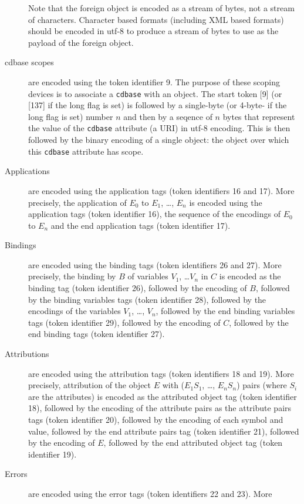 \documentclass{report}
\def\acronym#1{\textsf{#1}}
\begin{document}
\begin{description}
    Note that the foreign object is encoded as a stream of bytes, not a stream of
    characters. Character based formats (including XML based formats) should be encoded in
    \acronym{utf-8} to produce a stream of bytes to use as the payload of the foreign
    object.
  \item[cdbase scopes] are encoded using the token identifier 9. The purpose of these
    scoping devices is to associate a \lstinline|cdbase| with an object. The start token
    [9] (or [137] if the long flag is set) is followed by a single-byte (or 4-byte- if the
    long flag is set) number $n$ and then by a seqence of $n$ bytes that represent the
    value of the \lstinline|cdbase| attribute (a URI) in \acronym{utf-8} encoding. This
    is then followed by the binary encoding of a single object: the object over which this
    \lstinline|cdbase| attribute has scope.
  \item[Applications] are encoded using the application tags (token identifiers 16 and
    17). More precisely, the application of $E_0$ to $E_1$, \ldots, $E_n$ is encoded using
    the application tags (token identifier 16), the sequence of the encodings of $E_0$ to
    $E_n$ and the end application tags (token identifier 17).
  \item[Bindings] are encoded using the binding tags (token identifiers 26 and 27). More
    precisely, the binding by $B$ of variables $V_1$, \ldots $V_n$ in $C$ is encoded as
    the binding tag (token identifier 26), followed by the encoding of $B$, followed by
    the binding variables tags (token identifier 28), followed by the encodings of the
    variables $V_1$, \ldots, $V_n$, followed by the end binding variables tags (token
    identifier 29), followed by the encoding of $C$, followed by the end binding tags
    (token identifier 27).
  \item[Attributions] are encoded using the attribution tags (token identifiers 18 and
    19). More precisely, attribution of the object $E$ with ($E_1 S_1$, \ldots, $E_n S_n$)
    pairs (where $S_i$ are the attributes) is encoded as the attributed object tag (token
    identifier 18), followed by the encoding of the attribute pairs as the attribute pairs
    tags (token identifier 20), followed by the encoding of each symbol and value,
    followed by the end attribute pairs tag (token identifier 21), followed by the
    encoding of $E$, followed by the end attributed object tag (token identifier 19).
  \item[Errors] are encoded using the error tags (token identifiers 22 and 23). More

\end{description}
\end{document}
